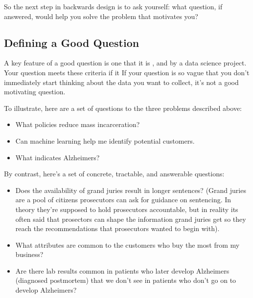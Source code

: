 \documentclass[letterpaper,10pt,english]{jupyterBook}
\begin{document}
\sphinxAtStartPar
So the next step in backwards design is to ask yourself: what question, if answered, would help you solve the problem that motivates you?


\subsection{Defining a Good Question}
\label{\detokenize{40_in_practice/00_backwards_design:defining-a-good-question}}
\sphinxAtStartPar
A key feature of a good question is one that it is ,  and  by a data science project. Your question meets these criteria if it  If your question is so vague that you don’t immediately start thinking about the data you want to collect, it’s not a good motivating question.

\sphinxAtStartPar
To illustrate, here are a set of  questions to the three problems described above:
\begin{itemize}
\item {} 
\sphinxAtStartPar
What policies reduce mass incarceration?

\item {} 
\sphinxAtStartPar
Can machine learning help me identify potential customers.

\item {} 
\sphinxAtStartPar
What indicates Alzheimers?

\end{itemize}

\sphinxAtStartPar
By contrast, here’s a set of concrete, tractable, and answerable questions:
\begin{itemize}
\item {} 
\sphinxAtStartPar
Does the availability of grand juries result in longer sentences? (Grand juries are a pool of citizens prosecutors can ask for guidance on sentencing. In theory they’re supposed to hold prosecutors accountable, but in reality its often said that prosectors can shape the information grand juries get so they reach the recommendations that prosecutors wanted to begin with).

\item {} 
\sphinxAtStartPar
What attributes are common to the customers who buy the most from my business?

\item {} 
\sphinxAtStartPar
Are there lab results common in patients who later develop Alzheimers (diagnosed post\sphinxhyphen{}mortem) that we don’t see in patients who don’t go on to develop Alzheimers?

\end{itemize}
\end{document}
